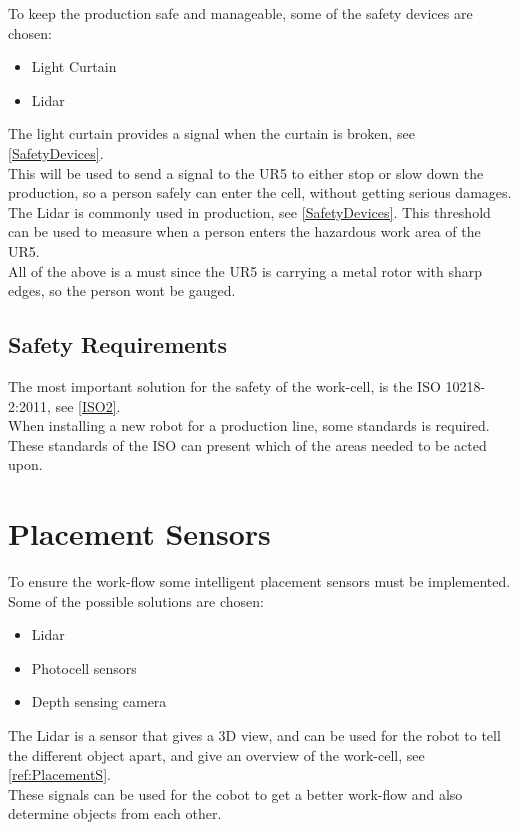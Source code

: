 To keep the production safe and manageable, some of the safety devices are chosen:

\begin{itemize}
    \item Light Curtain
    \item Lidar
\end{itemize}

The light curtain provides a signal when the curtain is broken, see \ref{SafetyDevices}.\\
This will be used to send a signal to the UR5 to either stop or slow down the production, so a person safely can enter the cell, without getting serious damages.\\

The Lidar is commonly used in production, see \ref{SafetyDevices}.
This threshold can be used to measure when a person enters the hazardous work area of the UR5.\\
All of the above is a must since the UR5 is carrying a metal rotor with sharp edges, so the person wont be gauged.\\

\subsection{Safety Requirements}

The most important solution for the safety of the work-cell, is the ISO 10218-2:2011, see \ref{ISO2}.\\
When installing a new robot for a production line, some standards is required. These standards of the ISO can present which of the areas needed to be acted upon.\\

\section{Placement Sensors}

To ensure the work-flow some intelligent placement sensors must be implemented. Some of the possible solutions are chosen:\\

\begin{itemize}
    \item Lidar
    \item Photocell sensors
    \item Depth sensing camera
\end{itemize}

The Lidar is a sensor that gives a 3D view, and can be used for the robot to tell the different object apart, and give an overview of the work-cell, see \ref{ref:PlacementS}.\\
These signals can be used for the cobot to get a better work-flow and also determine objects from each other.\\

